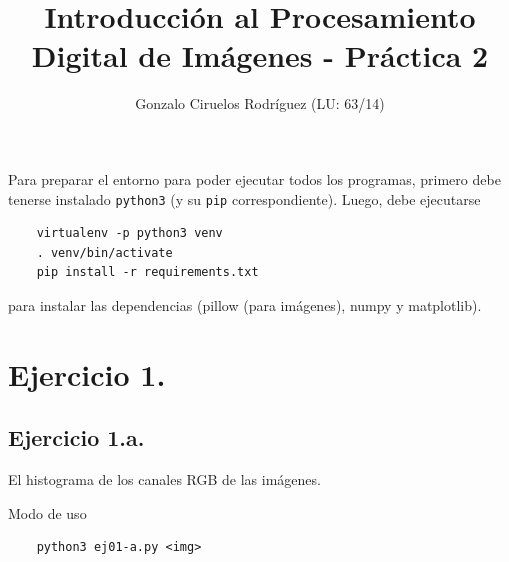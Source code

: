 \documentclass[11pt, spanish]{article}
\title{Introducción al Procesamiento Digital de Imágenes - Práctica 2}
\date{}
\author{Gonzalo Ciruelos Rodríguez (LU: 63/14)}
\begin{document}
\maketitle

Para preparar el entorno para poder ejecutar todos los programas,
primero debe tenerse instalado \texttt{python3} (y su \texttt{pip} correspondiente).
Luego, debe ejecutarse 
\begin{verbatim}
    virtualenv -p python3 venv 
    . venv/bin/activate
    pip install -r requirements.txt 
\end{verbatim}

\noindent para instalar las dependencias (pillow (para imágenes), numpy y matplotlib).



\section{Ejercicio 1.}
\subsection{Ejercicio 1.a.}

El histograma de los canales RGB de las imágenes.

Modo de uso
\begin{verbatim}
    python3 ej01-a.py <img>
\end{verbatim}
\end{document}
